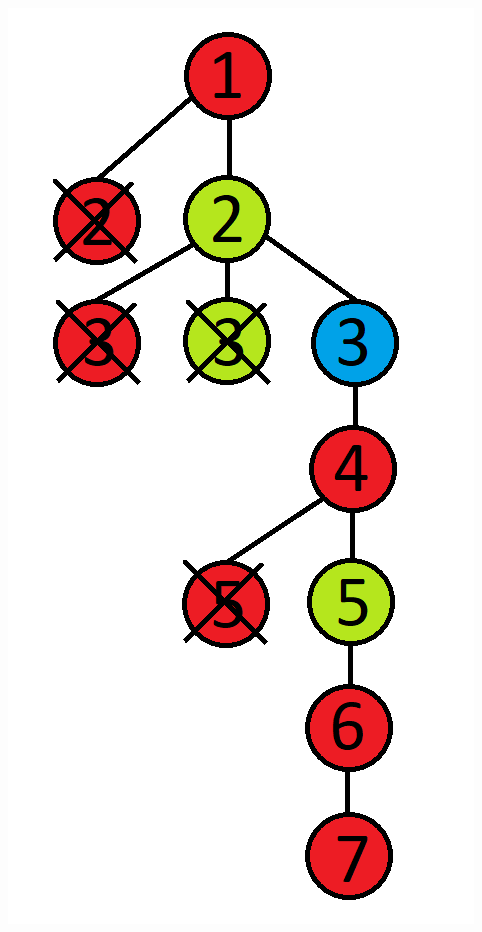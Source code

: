\documentclass[10pt,xcolor=pdflatex]{beamer}
\begin{document}
\begin{frame}
    \includegraphics[scale=0.3]{img/backtracking.png}
\end{frame}
\end{document}
